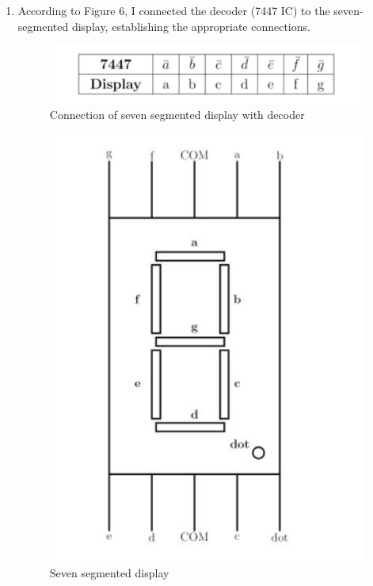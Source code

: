 \documentclass[journal,12pt,twocolumn]{IEEEtran}
\begin{document}
\begin{enumerate}
	\item According to Figure 6, I connected the decoder (7447 IC) to the seven-segmented display, establishing the appropriate connections. 
	\begin{figure}[h]
	\begin{center}
		\includegraphics[width=\linewidth]{images/7447_table.jpg}
		\caption{Connection of seven segmented display with decoder}
		\label{table}
		\end{center}
	\end{figure}
	\begin{figure}[h]
	\begin{center}
		\includegraphics[width=\linewidth]{images/seven_segment_display.jpg}
		\caption{Seven segmented display}
		\label{SSD}
		\end{center}
	\end{figure}


\end{enumerate}
\end{document}
